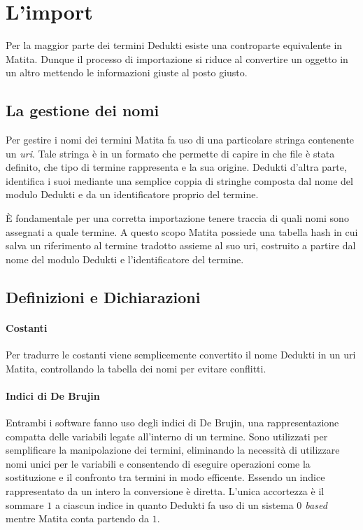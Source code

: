 \documentclass[12pt,a4paper]{mimosis}
\begin{document}
\section{L'import}
Per la maggior parte dei termini Dedukti esiste una controparte equivalente in Matita.
Dunque il processo di importazione si riduce al convertire un oggetto in un altro
mettendo le informazioni giuste al posto giusto. %

\subsection{La gestione dei nomi}
Per gestire i nomi dei termini Matita fa uso di una particolare stringa contenente un 
\textit{uri}. Tale stringa è in un formato che permette di capire in che file è stata
definito, che tipo di termine rappresenta e la sua origine. Dedukti d'altra parte, identifica
i suoi mediante una semplice coppia di stringhe composta dal nome del modulo Dedukti
e da un identificatore proprio del termine. 

È fondamentale per una corretta importazione tenere traccia di quali nomi sono
assegnati a quale termine. A questo scopo Matita possiede una tabella hash in cui salva
un riferimento al termine tradotto assieme al suo uri, costruito a partire dal nome
del modulo Dedukti e l'identificatore del termine.


\subsection{Definizioni e Dichiarazioni}

\paragraph{Costanti}
Per tradurre le costanti viene semplicemente convertito il nome Dedukti in un 
uri Matita, controllando la tabella dei nomi per evitare conflitti.

\paragraph{Indici di De Brujin}
Entrambi i software fanno uso degli indici di De Brujin, una rappresentazione
compatta delle variabili legate all'interno di un termine. Sono utilizzati per
semplificare la manipolazione dei termini, eliminando la necessità di utilizzare
nomi unici per le variabili e consentendo di eseguire operazioni come la 
sostituzione e il confronto tra termini in modo efficente. 
Essendo un indice rappresentato da un intero la conversione è diretta.
L'unica accortezza è il sommare $1$ a ciascun indice in quanto
Dedukti fa uso di un sistema \textit{$0$ based} mentre Matita conta partendo
da $1$.
\end{document}
